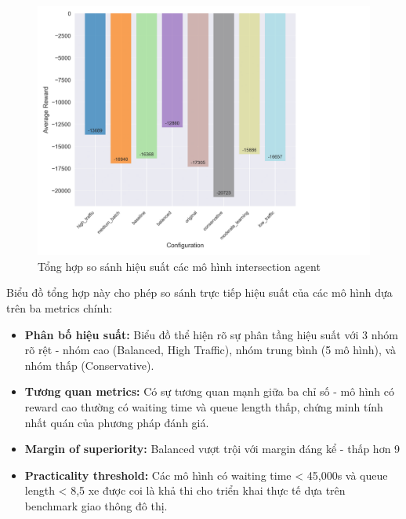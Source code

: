 \begin{figure}[!htp]
    \centering
    \includegraphics[width=\textwidth]{
        figures/individual_plots/intersection_filtered_performance_summary.png
    }
    \caption{Tổng hợp so sánh hiệu suất các mô hình intersection agent}
    \label{fig:intersection_filtered_performance_summary}
\end{figure}

Biểu đồ tổng hợp này cho phép so sánh trực tiếp hiệu suất của các mô hình dựa trên ba metrics chính:

\begin{itemize}
    \item \textbf{Phân bố hiệu suất:} Biểu đồ thể hiện rõ sự phân tầng hiệu suất với 3 nhóm rõ rệt - nhóm cao (Balanced, High Traffic), nhóm trung bình (5 mô hình), và nhóm thấp (Conservative).
    
    \item \textbf{Tương quan metrics:} Có sự tương quan mạnh giữa ba chỉ số - mô hình có reward cao thường có waiting time và queue length thấp, chứng minh tính nhất quán của phương pháp đánh giá.
    
    \item \textbf{Margin of superiority:} Balanced vượt trội với margin đáng kể - thấp hơn 9%
    
    \item \textbf{Practicality threshold:} Các mô hình có waiting time < 45,000s và queue length < 8,5 xe được coi là khả thi cho triển khai thực tế dựa trên benchmark giao thông đô thị.
\end{itemize}

